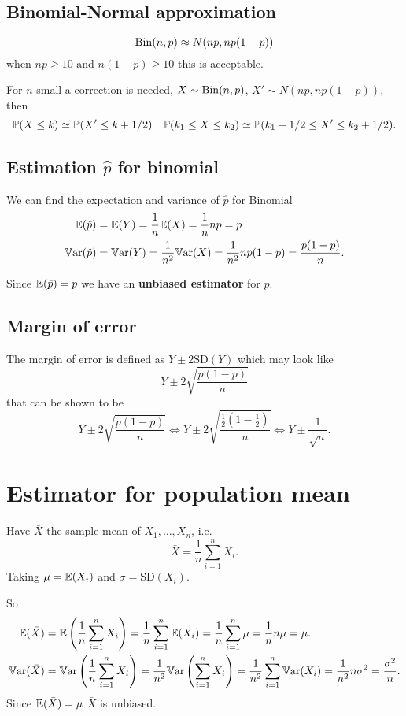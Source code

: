 \documentclass[10pt, a4paper]{article}
\begin{document}
\subsection{Binomial-Normal approximation}
\[
\Bin(n, p) \approx N(np, np(1 - p))
\]
when $np \geq 10$ and $n(1 - p) \geq 10$ this is acceptable.

For $n$ small a correction is needed,
$X \sim \Bin(n, p)$,
$X' \sim N(np, np(1 - p))$,
then
\[
\P(X \leq k) \simeq \P(X' \leq k + 1 / 2)\quad\P(k_1 \leq X \leq k_2) \simeq \P(k_1 - 1 / 2 \leq X' \leq k_2 + 1 / 2).
\]

\subsection{Estimation \texorpdfstring{$\hat{p}$}{} for binomial}
We can find the expectation and variance of $\hat{p}$ for Binomial
\begin{align*}
    \E(\hat{p}) &= \E(Y) = \frac{1}{n}\E(X) = \frac{1}{n}np = p \\
    \Var(\hat{p}) &= \Var(Y) = \frac{1}{n ^ 2}\Var(X) = \frac{1}{n ^ 2}np(1 - p) = \frac{p(1 - p)}{n}.
\end{align*}

Since $\E(\hat{p}) = p$ we have an \textbf{unbiased estimator} for $p$.

\subsection{Margin of error}

The margin of error is defined as $Y \pm 2\mathrm{SD}(Y)$ which may look like
\[
Y \pm 2\sqrt{\frac{p(1 - p)}{n}}
\]
that can be shown to be
\[
Y \pm 2\sqrt{\frac{p(1 - p)}{n}} \iff Y \pm 2\sqrt{\frac{\frac{1}{2}\left(1 - \frac{1}{2}\right)}{n}} \iff Y \pm \frac{1}{\sqrt{n}}.
\]

\newpage

\section{Estimator for population mean}
Have $\bar{X}$ the sample mean of $X_1, \dotsc, X_n$,
i.e.
\[
\bar{X} = \frac{1}{n}\sum_{i = 1}^{n}X_i.
\]
Taking $\mu = \E(X_i)$ and $\sigma = \mathrm{SD}(X_i)$.

So
\begin{align*}
    \E(\bar{X}) &= \E\left(\frac{1}{n}\sum_{i = 1}^{n}X_i\right) = \frac{1}{n}\sum_{i = 1}^{n}\E(X_i) = \frac{1}{n}\sum_{i = 1}^{n}\mu = \frac{1}{n}n\mu = \mu. \\
    \Var(\bar{X}) &= \Var\left(\frac{1}{n}\sum_{i = 1}^{n}X_i\right) = \frac{1}{n ^ 2}\Var\left(\sum_{i = 1}^{n}X_i\right) = \frac{1}{n ^ 2}\sum_{i = 1}^{n}\Var(X_i) = \frac{1}{n ^ 2}n\sigma ^ 2 = \frac{\sigma ^ 2}{n}.
\end{align*}
Since $\E(\bar{X}) = \mu$ $\bar{X}$ is unbiased.
\end{document}
